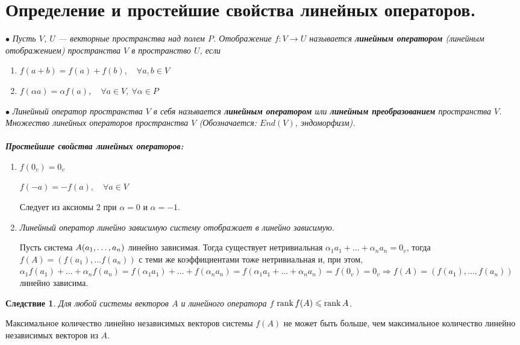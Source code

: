 \section{Определение и простейшие свойства линейных операторов.}
$\bullet$ \textit{Пусть $V$, $U$ --- векторные пространства над полем $P$. Отображение $f : V \rightarrow U$ называется \textbf{линейным оператором} (линейным отображением) пространства $V$ в пространство $U$, если}
\begin{enumerate}
	\item $f(a+b) = f(a) + f(b),\quad \forall a,b \in V$
	\item $f(\alpha a) = \alpha f(a), \quad \forall a\in V,\  \forall \alpha \in P$
\end{enumerate}
$\bullet$ \textit{Линейный оператор пространства $V$ в себя называется \textbf{линейным оператором} или \textbf{линейным преобразованием} пространства $V$. Множество линейных операторов пространства $V$ (Обозначается: $End(V)$, эндоморфизм).}\\\\
\textit{\textbf{Простейшие свойства линейных операторов:}}
\begin{enumerate}
	\item $f(0_v) = 0_v$
	
	$f(-a) = -f(a), \quad \forall a\in V$
	
	\begin{Proof}
		Следует из аксиомы 2 при $\alpha = 0$ и $\alpha = -1$.
	\end{Proof}
	
	\item \textit{Линейный оператор линейно зависимую систему отображает в линейно зависимую}.
	\begin{Proof}
		Пусть система $A(a_1,\dots,a_n)$ линейно зависимая. Тогда существует нетривиальная $\alpha_1 a_1 + \ldots + \alpha_n a_n = 0_v$, тогда $f(A) = (f(a_1),\dots f(a_n))$ с теми же коэффициентами тоже нетривиальная и, при этом, $\alpha_1 f(a_1) + \ldots + \alpha_n f(a_n) =f(\alpha_1 a_1) + \ldots + f(\alpha_n a_n) =f(\alpha_1 a_1 + \ldots + \alpha_n a_n) = f(0_v) = 0_v \Rightarrow f(A) = (f(a_1),\dots,f(a_n))$ линейно зависима.
	\end{Proof}
\end{enumerate}
\newtheorem*{cor2_1}{Следствие}\begin{cor2_1} Для любой системы векторов $A$ и линейного оператора $f$ $\operatorname{rank}  f(A) \leqslant \operatorname{rank}  A$.\end{cor2_1}\begin{Proof}
	Максимальное количество линейно независимых векторов системы $f(A)$ не может быть больше, чем максимальное количество линейно независимых векторов из $A$.
\end{Proof}
